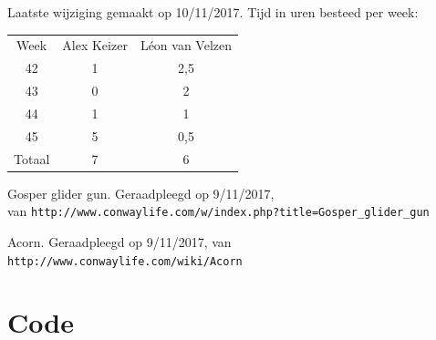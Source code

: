 \documentclass[10pt]{article}
\begin{document}
Laatste wijziging gemaakt op 10/11/2017. Tijd in uren besteed per week:

\begin{center}
\begin{tabular}{ |c|c|c| }
\hline
Week & Alex Keizer & L\'{e}on van Velzen \\
42 & 1 & 2,5 \\
43 & 0 & 2 \\
44 & 1 & 1 \\
45 & 5 & 0,5 \\ 
\hline
Totaal & 7 & 6 \\
\hline
\end{tabular}
\end{center}

\begin{thebibliography}{9}
     Gosper glider gun. Geraadpleegd op 9/11/2017, \\
van \verb+http://www.conwaylife.com/w/index.php?title=Gosper_glider_gun+

	 Acorn. Geraadpleegd op 9/11/2017, 
van \verb+http://www.conwaylife.com/wiki/Acorn+
\end{thebibliography}

\section{Code}


\end{document}
